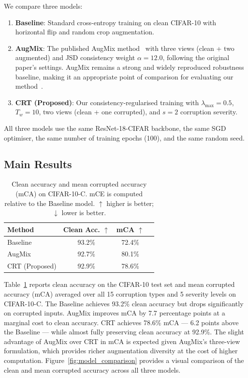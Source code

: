 \documentclass[10pt,twocolumn]{article}
\begin{document}
We compare three models:
\begin{enumerate}[leftmargin=*, topsep=2pt, itemsep=1pt]
  \item \textbf{Baseline}: Standard cross-entropy training on clean CIFAR-10 with horizontal flip and random crop augmentation.
  \item \textbf{AugMix}: The published AugMix method~\cite{hendrycks2020augmix} with three views (clean + two augmented) and JSD consistency weight $\alpha = 12.0$, following the original paper's settings. AugMix remains a strong and widely reproduced robustness baseline, making it an appropriate point of comparison for evaluating our method~\cite{erichson2024noisymix,khazem2026macs}.
  \item \textbf{CRT (Proposed)}: Our consistency-regularised training with $\lambda_{\max} = 0.5$, $T_w = 10$, two views (clean + one corrupted), and $s = 2$ corruption severity.
\end{enumerate}

All three models use the same ResNet-18-CIFAR backbone, the same SGD optimiser, the same number of training epochs (100), and the same random seed.

\subsection{Main Results}

\begin{table}[t]
\centering
\caption{Clean accuracy and mean corrupted accuracy (mCA) on CIFAR-10-C. mCE is computed relative to the Baseline model. $\uparrow$ higher is better; $\downarrow$ lower is better.}
\label{tab:main_results}
\begin{tabular}{lccc}
\toprule
\textbf{Method} & \textbf{Clean Acc.} $\uparrow$ & \textbf{mCA} $\uparrow$   \\
\midrule
Baseline        & 93.2\%       & 72.4\% \\
AugMix          & 92.7\%       & 80.1\% \\
CRT (Proposed)  & 92.9\%       & 78.6\% \\
\bottomrule
\end{tabular}
\end{table}

Table~\ref{tab:main_results} reports clean accuracy on the CIFAR-10 test set and mean corrupted accuracy (mCA) averaged over all 15 corruption types and 5 severity levels on CIFAR-10-C. The Baseline achieves 93.2\% clean accuracy but drops significantly on corrupted inputs. AugMix improves mCA by 7.7 percentage points at a marginal cost to clean accuracy. CRT achieves 78.6\% mCA --- 6.2 points above the Baseline --- while almost fully preserving clean accuracy at 92.9\%. The slight advantage of AugMix over CRT in mCA is expected given AugMix's three-view formulation, which provides richer augmentation diversity at the cost of higher computation. Figure~\ref{fig:model_comparison} provides a visual comparison of the clean and mean corrupted accuracy across all three models.
\end{document}
